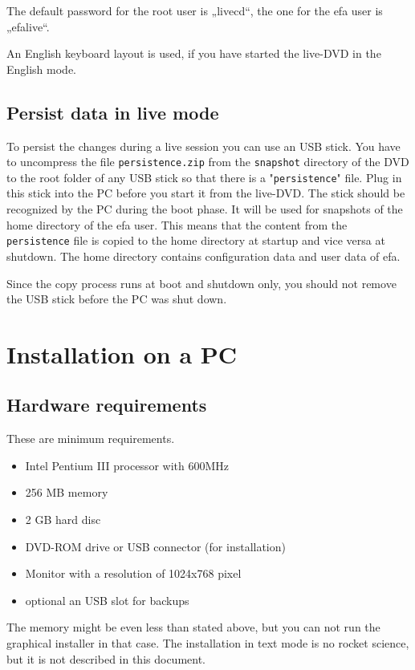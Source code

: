 \documentclass[a4paper,12pt,twoside]{article}
\begin{document}
The default password for the root user is „livecd“, the one for the efa
user is „efalive“.

An English keyboard layout is used, if you have started the live-DVD in
the English mode.


\subsection{Persist data in live mode}
\label{sct:live_persist}
To persist the changes during a live session you can use an USB stick.
You have to uncompress the file \texttt{persistence.zip} from the \texttt{snapshot}
directory of the DVD to the root folder of any USB stick so that there
is a "\texttt{persistence}" file. Plug in this stick
into the PC before you start it from the live-DVD. The stick should be
recognized by the PC during the boot phase. It will be used for
snapshots of the home directory of the efa user. This means that the
content from the \texttt{persistence} file is copied to the home directory at
startup and vice versa at shutdown. The home directory contains
configuration data and user data of efa.

Since the copy process runs at boot and shutdown only, you should not
remove the USB stick before the PC was shut down.


\section{Installation on a PC}
\label{sct:installation_pc}
\subsection{Hardware requirements}
\label{sct:inst_hardware}
These are minimum requirements.

\begin{itemize}
    \item Intel Pentium III processor with 600MHz
    \item 256 MB memory
    \item 2 GB hard disc
    \item DVD-ROM drive or USB connector (for installation)
    \item Monitor with a resolution of 1024x768 pixel
    \item optional an USB slot for backups
\end{itemize}

The memory might be even less than stated above, but you can not run the
graphical installer in that case. The installation in text mode is no
rocket science, but it is not described in this document.
\end{document}
